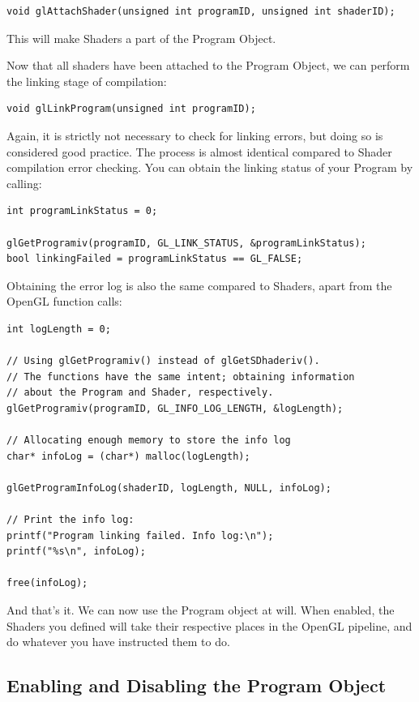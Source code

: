 \begin{verbatim}
void glAttachShader(unsigned int programID, unsigned int shaderID);
\end{verbatim}

This will make Shaders a part of the Program Object. 

Now that all shaders have been attached to the Program Object, we can perform the linking stage of compilation:

\begin{verbatim}
void glLinkProgram(unsigned int programID);
\end{verbatim}

Again, it is strictly not necessary to check for linking errors, but doing so is considered good practice. The process is almost identical compared to Shader compilation error checking. You can obtain the linking status of your Program by calling:

\begin{verbatim}
int programLinkStatus = 0;

glGetProgramiv(programID, GL_LINK_STATUS, &programLinkStatus);
bool linkingFailed = programLinkStatus == GL_FALSE;
\end{verbatim}

Obtaining the error log is also the same compared to Shaders, apart from the OpenGL function calls:

\begin{verbatim}
int logLength = 0;

// Using glGetProgramiv() instead of glGetSDhaderiv().
// The functions have the same intent; obtaining information
// about the Program and Shader, respectively.
glGetProgramiv(programID, GL_INFO_LOG_LENGTH, &logLength);

// Allocating enough memory to store the info log
char* infoLog = (char*) malloc(logLength);

glGetProgramInfoLog(shaderID, logLength, NULL, infoLog);

// Print the info log:
printf("Program linking failed. Info log:\n");
printf("%s\n", infoLog);

free(infoLog);
\end{verbatim}

And that's it. We can now use the Program object at will. When enabled, the Shaders you defined will take their respective places in the OpenGL pipeline, and do whatever you have instructed them to do.

\subsection{Enabling and Disabling the Program Object}

